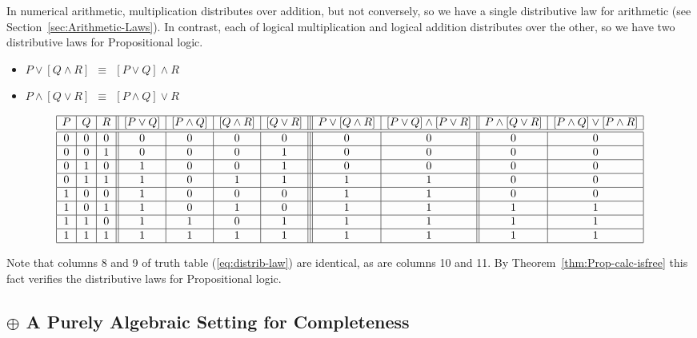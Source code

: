 \noindent
In numerical arithmetic, multiplication distributes over addition, but
not conversely, so we have a single distributive law for arithmetic
(see Section~\ref{sec:Arithmetic-Laws}).  In contrast, each of logical
multiplication and logical addition distributes over the other, so we
have two distributive laws for Propositional logic.
\begin{itemize}
\item
$ P \vee [ Q \wedge R] \ \ \equiv \ \ [P \vee Q] \wedge R$
\item
$P \wedge [ Q \vee R] \ \ \equiv \ \ [P \wedge Q] \vee R$
\end{itemize}
{\small
\begin{equation}
\label{eq:distrib-law}
\begin{array}{|c|c|c||c|c|c|c|||c|c||c|c|}
\hline
P & Q & R
  & [P \vee Q]
  & [P \wedge Q]
  & [Q \wedge R] 
  & [Q \vee R] 
  & P \vee [ Q \wedge R]
  & [P \vee Q] \wedge [P \vee R]
  & P \wedge [ Q \vee R]
  & [P \wedge Q] \vee [P \wedge R] \\
\hline
\hline
0 & 0 & 0
  & 0
  & 0
  & 0
  & 0
  & 0
  & 0
  & 0
  & 0 \\ 
\hline
0 & 0 & 1
  & 0
  & 0
  & 0
  & 1
  & 0
  & 0
  & 0 
  & 0 \\
\hline
0 & 1 & 0
  & 1
  & 0
  & 0
  & 1
  & 0
  & 0
  & 0
  & 0 \\
\hline
0 & 1 & 1
  & 1
  & 0
  & 1
  & 1
  & 1
  & 1
  & 0
  & 0 \\
\hline
1 & 0 & 0
  & 1
  & 0
  & 0
  & 0
  & 1
  & 1
  & 0
  & 0 \\
\hline
1 & 0 & 1
  & 1
  & 0
  & 1
  & 0
  & 1
  & 1
  & 1
  & 1 \\
\hline
1 & 1 & 0
  & 1
  & 1
  & 0
  & 1
  & 1
  & 1
  & 1
  & 1 \\
\hline
1 & 1 & 1
  & 1
  & 1
  & 1
  & 1
  & 1
  & 1
  & 1
  & 1 \\
\hline
\end{array}
\end{equation}
}

Note that columns 8 and 9 of truth table (\ref{eq:distrib-law}) are
identical, as are columns 10 and 11.  By
Theorem~\ref{thm:Prop-calc-isfree} this fact verifies the distributive
laws for Propositional logic.


\subsection{$\oplus$ A Purely Algebraic Setting for Completeness}

